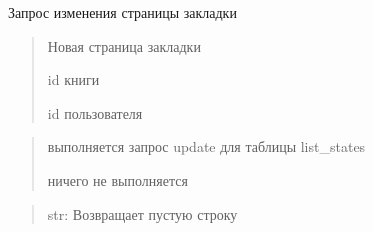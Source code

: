 \documentclass[letterpaper,10pt,russian]{sphinxmanual}
\begin{document}
\begin{fulllineitems}
\label{\detokenize{blueprints:blueprints.book_read.change_page_marker}}
\pysigstartsignatures
{}
\pysigstopsignatures
\sphinxAtStartPar
Запрос изменения страницы закладки
\begin{description}
\begin{quote}\begin{description}
\sphinxAtStartPar
Новая страница закладки

\sphinxAtStartPar
id книги

\sphinxAtStartPar
id пользователя

\end{description}\end{quote}

\begin{quote}\begin{description}
\sphinxAtStartPar
выполняется запрос update для таблицы list\_states

\sphinxAtStartPar
ничего не выполняется

\end{description}\end{quote}

\end{description}
\begin{quote}\begin{description}
\sphinxAtStartPar
str: Возвращает пустую строку

\end{description}\end{quote}

\end{fulllineitems}

\end{document}
